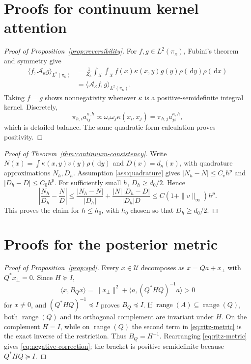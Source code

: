 \documentclass[11pt,a4paper]{article}
\numberwithin{equation}{section}
\theoremstyle{definition}
\theoremstyle{remark}
\newcommand{\calU}{\mathcal U}
\newcommand{\calA}{\mathcal A}
\newcommand{\range}{\operatorname{range}}
\newcommand{\dd}{\,\mathrm d}
\begin{document}
\clearpage
\appendix

\section{Proofs for continuum kernel attention}

\begin{proof}[Proof of Proposition~\ref{prop:reversibility}]
For $f,g\in L^2(\pi_\kappa)$, Fubini's theorem and symmetry give
\begin{align*}
 \langle f,\calA_\kappa g\rangle_{L^2(\pi_\kappa)}
 &=\frac1{Z_\kappa}\int_X\int_X
 f(x)\kappa(x,y)g(y)\rho(\dd y)\rho(\dd x)\\
 &=\langle\calA_\kappa f,g\rangle_{L^2(\pi_\kappa)}.
\end{align*}
Taking $f=g$ shows nonnegativity whenever $\kappa$ is a positive-semidefinite
integral kernel.  Discretely,
\[
 \pi_{h,i}a_{ij}^{\kappa,h}
 \propto\omega_i\omega_j\kappa(x_i,x_j)
 =\pi_{h,j}a_{ji}^{\kappa,h},
\]
which is detailed balance.  The same quadratic-form calculation proves
positivity.
\end{proof}

\begin{proof}[Proof of Theorem~\ref{thm:continuum-consistency}]
Write $N(x)=\int\kappa(x,y)v(y)\rho(\dd y)$ and
$D(x)=d_\kappa(x)$, with quadrature approximations $N_h,D_h$.  Assumption
\ref{ass:quadrature} gives $|N_h-N|\le C_vh^p$ and
$|D_h-D|\le C_0h^p$.  For sufficiently small $h$, $D_h\ge d_0/2$.  Hence
\[
 \left|\frac{N_h}{D_h}-\frac ND\right|
 \le\frac{|N_h-N|}{|D_h|}
 +\frac{|N|\,|D_h-D|}{|D_h|D}
 \le C(1+\|v\|_\infty)h^p.
\]
This proves the claim for \(h\le h_0\), with \(h_0\) chosen so that
\(D_h\ge d_0/2\).
\end{proof}

\section{Proofs for the posterior metric}

\begin{proof}[Proof of Proposition~\ref{prop:spd}]
Every $x\in\calU$ decomposes as $x=Qa+x_\perp$ with $Q^*x_\perp=0$.  Since
$H\succeq I$,
\[
 \langle x,B_Qx\rangle
 =\|x_\perp\|^2+
 \langle a,(Q^*HQ)^{-1}a\rangle>0
\]
for $x\ne0$, and $(Q^*HQ)^{-1}\preceq I$ proves $B_Q\preceq I$.
If $\range(A)\subseteq\range(Q)$, both $\range(Q)$ and its orthogonal
complement are invariant under $H$.  On the complement $H=I$, while on
$\range(Q)$ the second term in \eqref{eq:ritz-metric} is the exact inverse of
the restriction.  Thus $B_Q=H^{-1}$.  Rearranging
\eqref{eq:ritz-metric} gives \eqref{eq:negative-correction}; the bracket is
positive semidefinite because $Q^*HQ\succeq I$.
\end{proof}
\end{document}
